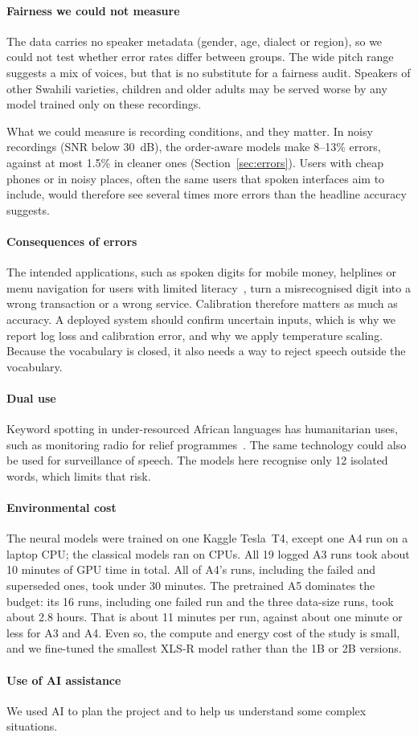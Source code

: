 \paragraph{Fairness we could not measure}
The data carries no speaker metadata (gender, age, dialect or region), so we could not test whether error rates
differ between groups. The wide pitch range suggests a mix of voices, but that is no substitute for a fairness
audit. Speakers of other Swahili varieties, children and older adults may be served worse by any model trained
only on these recordings.

What we could measure is recording conditions, and they matter. In noisy recordings (SNR below 30~dB), the
order-aware models make 8--13\% errors, against at most 1.5\% in cleaner ones (Section~\ref{sec:errors}). Users
with cheap phones or in noisy places, often the same users that spoken interfaces aim to include, would therefore
see several times more errors than the headline accuracy suggests.

\paragraph{Consequences of errors}
The intended applications, such as spoken digits for mobile money, helplines or menu navigation for users with
limited literacy~\cite{doumbouya2021using}, turn a misrecognised digit into a wrong transaction or a wrong service.
Calibration therefore matters as much as accuracy. A deployed system should confirm uncertain inputs, which is why
we report log loss and calibration error, and why we apply temperature scaling. Because the vocabulary is closed,
it also needs a way to reject speech outside the vocabulary.

\paragraph{Dual use}
Keyword spotting in under-resourced African languages has humanitarian uses, such as monitoring radio for relief
programmes~\cite{menon2018fast}. The same technology could also be used for surveillance of speech. The models
here recognise only 12 isolated words, which limits that risk.

\paragraph{Environmental cost}
The neural models were trained on one Kaggle Tesla~T4, except one A4 run on a laptop CPU; the classical models ran
on CPUs. All 19 logged A3 runs took about 10 minutes of GPU time in total. All of A4's runs, including the failed
and superseded ones, took under 30 minutes. The pretrained A5 dominates the budget: its 16 runs, including one failed
run and the three data-size runs, took about 2.8 hours. That is about 11 minutes per run, against about one minute
or less for A3 and A4. Even so, the compute and energy cost of the study is small, and we fine-tuned the smallest
XLS-R model rather than the 1B or 2B versions.

\paragraph{Use of AI assistance}
We used AI to plan the project and to help us understand some complex situations.
